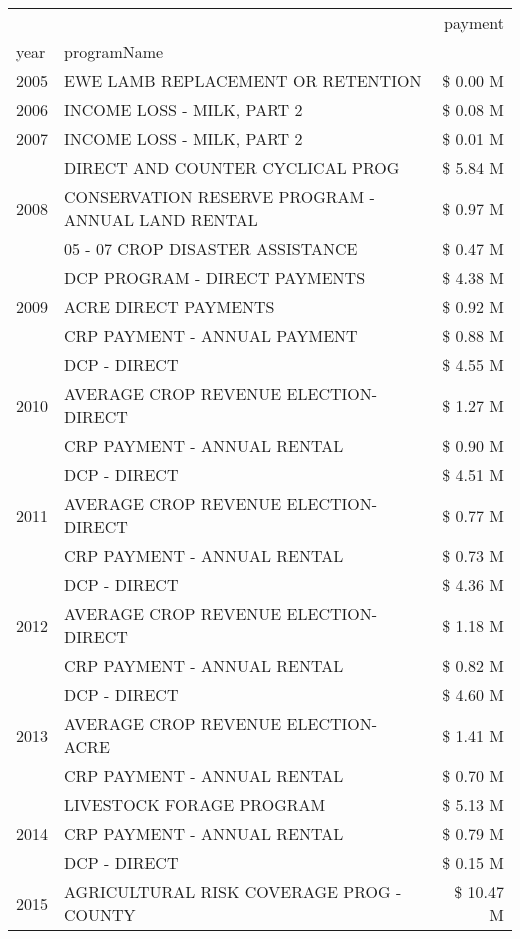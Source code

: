\begin{tabular}{llr}
\toprule
 &  & payment \\
year & programName &  \\
\midrule
2005 & EWE LAMB REPLACEMENT OR RETENTION & \$ 0.00 M \\
\cline{1-3}
2006 & INCOME LOSS - MILK, PART 2 & \$ 0.08 M \\
\cline{1-3}
2007 & INCOME LOSS - MILK, PART 2 & \$ 0.01 M \\
\cline{1-3}
\multirow[t]{3}{*}{2008} & DIRECT AND COUNTER CYCLICAL PROG & \$ 5.84 M \\
 & CONSERVATION RESERVE PROGRAM - ANNUAL LAND RENTAL & \$ 0.97 M \\
 & 05 - 07 CROP DISASTER ASSISTANCE & \$ 0.47 M \\
\cline{1-3}
\multirow[t]{3}{*}{2009} & DCP PROGRAM - DIRECT PAYMENTS & \$ 4.38 M \\
 & ACRE DIRECT PAYMENTS & \$ 0.92 M \\
 & CRP PAYMENT - ANNUAL PAYMENT & \$ 0.88 M \\
\cline{1-3}
\multirow[t]{3}{*}{2010} & DCP - DIRECT & \$ 4.55 M \\
 & AVERAGE CROP REVENUE ELECTION-DIRECT & \$ 1.27 M \\
 & CRP PAYMENT - ANNUAL RENTAL & \$ 0.90 M \\
\cline{1-3}
\multirow[t]{3}{*}{2011} & DCP - DIRECT & \$ 4.51 M \\
 & AVERAGE CROP REVENUE ELECTION-DIRECT & \$ 0.77 M \\
 & CRP PAYMENT - ANNUAL RENTAL & \$ 0.73 M \\
\cline{1-3}
\multirow[t]{3}{*}{2012} & DCP - DIRECT & \$ 4.36 M \\
 & AVERAGE CROP REVENUE ELECTION-DIRECT & \$ 1.18 M \\
 & CRP PAYMENT - ANNUAL RENTAL & \$ 0.82 M \\
\cline{1-3}
\multirow[t]{3}{*}{2013} & DCP - DIRECT & \$ 4.60 M \\
 & AVERAGE CROP REVENUE ELECTION-ACRE & \$ 1.41 M \\
 & CRP PAYMENT - ANNUAL RENTAL & \$ 0.70 M \\
\cline{1-3}
\multirow[t]{3}{*}{2014} & LIVESTOCK FORAGE PROGRAM & \$ 5.13 M \\
 & CRP PAYMENT - ANNUAL RENTAL & \$ 0.79 M \\
 & DCP - DIRECT & \$ 0.15 M \\
\cline{1-3}
\multirow[t]{3}{*}{2015} & AGRICULTURAL RISK COVERAGE PROG - COUNTY & \$ 10.47 M \\

\end{tabular}
